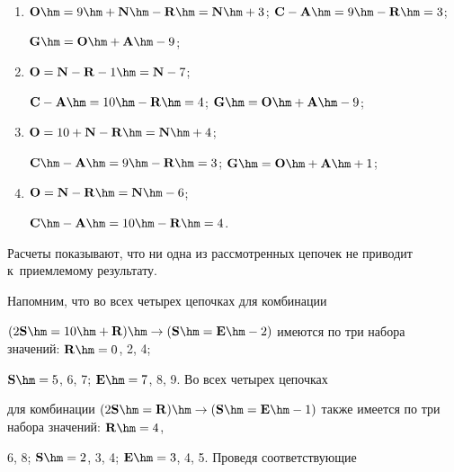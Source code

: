     \begin{enumerate}[(1)]


    \item  $\mathbf{O}\hm = 9 \hm+ \mathbf{N}\hm- \mathbf{R}\hm = 


\mathbf{N}\hm + 3$; $\mathbf{C}-\mathbf{A}\hm = 9 \hm- \mathbf{R}\hm = 3$; 


$\mathbf{G}\hm = \mathbf{O} \hm+ \mathbf{A}\hm- 9$; 


    \item  $\mathbf{O} = \mathbf{N}- \mathbf{R}- 1 \hm= \mathbf{N}- 7$; 


$\mathbf{C} -\mathbf{A}\hm= 10 \hm- \mathbf{R}\hm = 4$; $\mathbf{G} \hm= \mathbf{O}\hm 


+ \mathbf{A} \hm- 9$; 


    \item  $\mathbf{O} = 10 + \mathbf{N}- \mathbf{R}\hm = \mathbf{N}\hm + 4$; 


$\mathbf{C}\hm- \mathbf{A}\hm = 9 \hm- \mathbf{R} \hm= 3$; $\mathbf{G}\hm = 


\mathbf{O}\hm + \mathbf{A}\hm + 1$; 


    \item $\mathbf{O} = \mathbf{N}- \mathbf{R}\hm = \mathbf{N}\hm- 6$; 


$\mathbf{C}\hm- \mathbf{A}\hm= 10 \hm- \mathbf{R} \hm= 4$. 


    \end{enumerate}


    


    Расчеты показывают, что ни одна из рассмотренных цепочек не приводит к~приемлемому результату. 


    


    Напомним, что во всех четырех цепочках для комбинации 


$(2\mathbf{S}\hm = 10 \hm+ \mathbf{R}) \hm\to (\mathbf{S}\hm = 


\mathbf{E}\hm- 2)$ имеются по три набора значений: $\mathbf{R}\hm = 0$, 2, 4; 


$\mathbf{S}\hm = 5$, 6, 7; $\mathbf{E}\hm = 7$, 8, 9. Во всех четырех цепочках 


для комбинации $(2\mathbf{S}\hm = \mathbf{R}) \hm\to (\mathbf{S}\hm = 


\mathbf{E}\hm- 1)$ также имеется по три набора значений: $\mathbf{R}\hm = 4$, 


6, 8; $\mathbf{S}\hm = 2$, 3, 4; $\mathbf{E}\hm = 3$, 4, 5. Проведя соответствующие 


